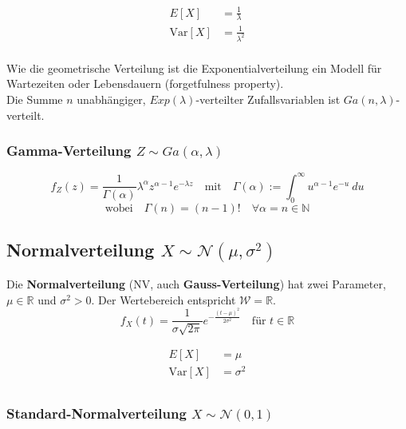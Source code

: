 \documentclass[11pt]{article}
\newcommand{\Var}{\text{Var}}
\begin{document}
\begin{equation*}
\begin{split}
	E[X] & = \frac{1}{\lambda} \\
	\Var[X] & = \frac{1}{\lambda^2} \\
\end{split}
\end{equation*}

Wie die geometrische Verteilung ist die Exponentialverteilung ein Modell f{\"u}r Wartezeiten oder Lebensdauern (forgetfulness property). \\
Die Summe $n$ unabh{\"a}ngiger, $Exp(\lambda)$-verteilter Zufallsvariablen ist $Ga(n, \lambda)$-verteilt.

\subsubsection{Gamma-Verteilung $Z \sim Ga(\alpha, \lambda)$}

\begin{equation*}
	f_Z(z) = \frac{1}{\Gamma (\alpha)}\lambda^\alpha z^{\alpha-1} e^{-\lambda z} \quad\text{mit}\quad \Gamma(\alpha) := \int_0^\infty u^{\alpha-1}e^{-u}\ du
\end{equation*}
\begin{equation*}
	\text{wobei}\quad \Gamma(n) = (n-1)! \quad \forall \alpha = n \in \mathbb{N}
\end{equation*}

\subsection{Normalverteilung $X \sim \mathcal{N}(\mu, \sigma^2)$}

Die \textbf{Normalverteilung} (NV, auch \textbf{Gauss-Verteilung}) hat zwei Parameter, $\mu \in \mathbb{R}$ und $\sigma^2 > 0$. Der Wertebereich entspricht $\mathcal{W} = \mathbb{R}$.
\begin{equation*}
	f_X(t) = \frac{1}{\sigma\sqrt{2\pi}}e^{-\frac{(t-\mu)^2}{2\sigma^2}}\quad\text{f{\"u}r } t \in \mathbb{R}
\end{equation*}

\begin{equation*}
\begin{split}
	E[X] & = \mu \\
	\Var[X] & = \sigma^2 \\
\end{split}
\end{equation*}

\subsubsection{Standard-Normalverteilung $X \sim \mathcal{N}(0, 1)$}
\end{document}
